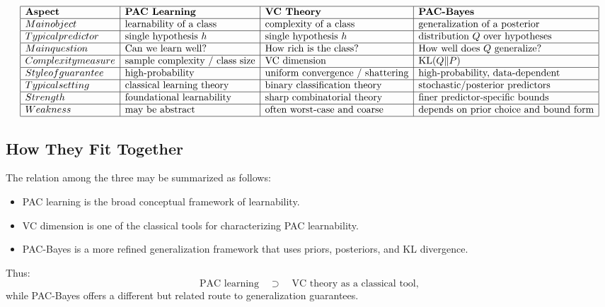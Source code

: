 \[
\begin{array}{|l|l|l|l|}
\hline
\textbf{Aspect} & \textbf{PAC Learning} & \textbf{VC Theory} & \textbf{PAC-Bayes} \\
\hline
Main object &
\text{learnability of a class} &
\text{complexity of a class} &
\text{generalization of a posterior} \\
\hline
Typical predictor &
\text{single hypothesis } h &
\text{single hypothesis } h &
\text{distribution } Q \text{ over hypotheses} \\
\hline
Main question &
\text{Can we learn well?} &
\text{How rich is the class?} &
\text{How well does } Q \text{ generalize?} \\
\hline
Complexity measure &
\text{sample complexity / class size} &
\text{VC dimension} &
\mathrm{KL}(Q\|P) \\
\hline
Style of guarantee &
\text{high-probability} &
\text{uniform convergence / shattering} &
\text{high-probability, data-dependent} \\
\hline
Typical setting &
\text{classical learning theory} &
\text{binary classification theory} &
\text{stochastic/posterior predictors} \\
\hline
Strength &
\text{foundational learnability} &
\text{sharp combinatorial theory} &
\text{finer predictor-specific bounds} \\
\hline
Weakness &
\text{may be abstract} &
\text{often worst-case and coarse} &
\text{depends on prior choice and bound form} \\
\hline
\end{array}
\]

\subsection{How They Fit Together}

The relation among the three may be summarized as follows:
\begin{itemize}
    \item PAC learning is the broad conceptual framework of learnability.
    \item VC dimension is one of the classical tools for characterizing PAC learnability.
    \item PAC-Bayes is a more refined generalization framework that uses priors, posteriors, and KL divergence.
\end{itemize}

Thus:
\[
\text{PAC learning} \quad \supset \quad \text{VC theory as a classical tool},
\]
while PAC-Bayes offers a different but related route to generalization guarantees.

